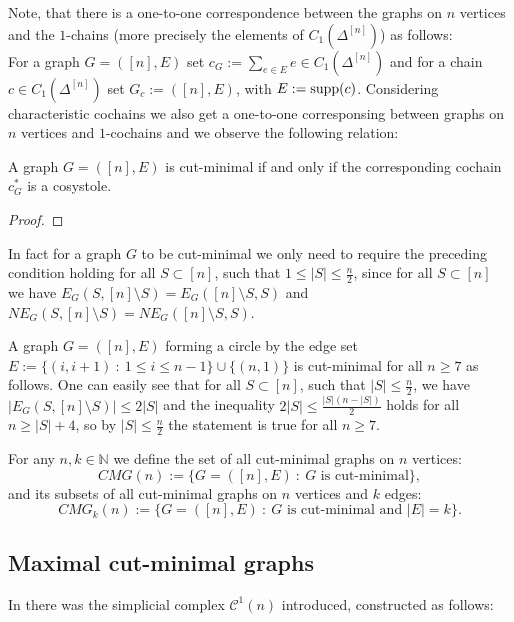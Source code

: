 Note, that there is a one-to-one correspondence between the graphs on \(n\) vertices and the \(1\)-chains (more precisely the elements of \(C_1(\Delta^{[n]})\)) as follows:\\
For a graph \(G=([n],E)\) set \(c_G:=\sum\limits_{e\in E}e\in C_1(\Delta^{[n]})\) and for a chain \(c\in C_1(\Delta^{[n]})\) set \(G_c:=([n],E)\), with \(E:=\mathrm{supp}(c)\). Considering characteristic cochains we also get a one-to-one corresponsing between graphs on \(n\) vertices and \(1\)-cochains and we observe the following relation:

\begin{lem}\label{lemma16}
A graph \(G=([n],E)\) is cut-minimal if and only if the corresponding cochain \(c_G^*\) is a cosystole.
\begin{proof}
\end{proof}
\end{lem}

\begin{rem}\label{remark1}
In fact for a graph \(G\) to be cut-minimal we only need to require the preceding condition holding for all \(S\subset [n]\), such that \(1\leq|S|\leq\frac{n}{2}\), since for all \(S\subset [n]\) we have \(E_G(S,[n]\setminus S)=E_G([n]\setminus S,S)\) and \(NE_G(S,[n]\setminus S)=NE_G([n]\setminus S,S)\).
\end{rem}

\begin{expl}
A graph \(G=([n],E)\) forming a circle by the edge set\\
\(E:=\{(i,i+1)\: :\: 1\leq i\leq n-1\}\cup\{(n,1)\}\) is cut-minimal for all \(n\geq 7\) as follows. One can easily see that for all \(S\subset [n]\), such that \(|S|\leq\frac{n}{2}\), we have \(|E_G(S,[n]\setminus S)|\leq 2|S|\) and the inequality \(2|S|\leq\frac{|S|(n-|S|)}{2}\) holds for all \(n\geq |S|+4\), so by \(|S|\leq\frac{n}{2}\) the statement is true for all \(n\geq 7\).
\end{expl}

\begin{defi}
For any \(n,k\in\mathbb{N}\) we define the set of all cut-minimal graphs on \(n\) vertices:
\[
CMG(n):=\{G=([n],E)\: :\: G\text{ is cut-minimal}\},
\]
and its subsets of all cut-minimal graphs on \(n\) vertices and \(k\) edges:
\[
CMG_k(n):=\{G=([n],E)\: :\: G\text{ is cut-minimal and }|E|=k\}.
\]
\end{defi}

\subsection{Maximal cut-minimal graphs}
In \cite{1} there was the simplicial complex \(\mathcal{C}^1(n)\) introduced, constructed as follows:

